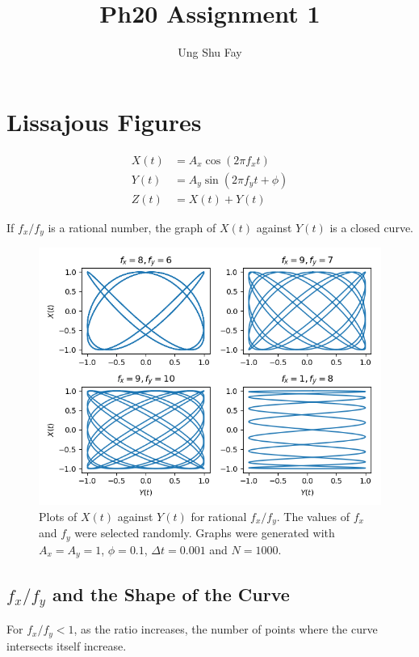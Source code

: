 \documentclass{article}
\title{Ph20 Assignment 1}
\author{Ung Shu Fay}
\begin{document}
\maketitle

\section{Lissajous Figures}
	\begin{align}
		X(t) &= A_x \cos (2 \pi f_x t) \\
		Y(t) &= A_y \sin(2 \pi f_y t + \phi) \\
		Z(t) &= X(t) + Y(t)
	\end{align}

	If $f_x/f_y$ is a rational number, the graph of $X(t)$ against $Y(t)$ is a closed curve.

	\begin{figure}[H]
		\centering
		\includegraphics[scale=0.6]{plots/rational.png}
		\caption
		{
			Plots of $X(t)$ against $Y(t)$ for rational $f_x/f_y$. The values of $f_x$ and $f_y$ were selected randomly. Graphs were generated with $A_x = A_y = 1$, $\phi = 0.1$, $\Delta{t} = 0.001$ and $N = 1000$.
		}
	\end{figure}

	\subsection{$f_x/f_y$ and the Shape of the Curve}
		For $f_x/f_y < 1$, as the ratio increases, the number of points where the curve intersects itself increase.
\end{document}
